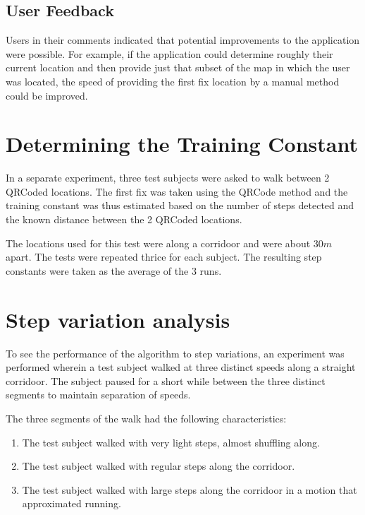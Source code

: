 
\subsection{User Feedback}

Users in their comments indicated that potential improvements to the 
application were possible. For example, if the application could determine 
roughly their current location and then provide just that subset of the map
in which the user was located, the speed of providing the first fix location 
by a manual method could be improved.

\section{Determining the Training Constant}

In a separate experiment, three test subjects were asked to walk between 
2 QRCoded locations. The first fix was taken using the QRCode method and 
the training constant was thus estimated based on the number of steps 
detected and the known distance between the 2 QRCoded locations.

The locations used for this test were along a corridoor and were about $30 m$
apart. The tests were repeated thrice for each subject. The resulting 
step constants were taken as the average of the 3 runs.


\section{Step variation analysis}

To see the performance of the algorithm to step variations, an experiment 
was performed wherein a test subject walked at three distinct speeds
along a straight corridoor. The subject paused for a short while between 
the three distinct segments to maintain separation of speeds.

The three segments of the walk had the following
characteristics:

\begin{enumerate}
\item The test subject walked with very light steps, almost shuffling along. 
\item The test subject walked with regular steps along the corridoor.
\item The test subject walked with large steps along the corridoor in a motion
    that approximated running.
\end{enumerate}

